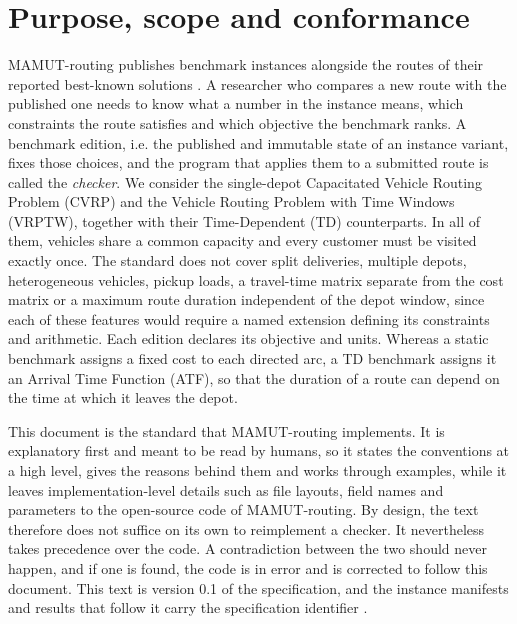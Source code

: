 \section{Purpose, scope and conformance}\label{sec:scope}

MAMUT-routing publishes benchmark instances alongside the routes of their reported best-known solutions \autocite{pichonMAMUTRouting2026}. A researcher who compares a new route with the published one needs to know what a number in the instance means, which constraints the route satisfies and which objective the benchmark ranks. A benchmark edition, i.e. the published and immutable state of an instance variant, fixes those choices, and the program that applies them to a submitted route is called the \emph{checker}. We consider the single-depot Capacitated Vehicle Routing Problem (CVRP) and the Vehicle Routing Problem with Time Windows (VRPTW), together with their Time-Dependent (TD) counterparts. In all of them, vehicles share a common capacity and every customer must be visited exactly once. The standard does not cover split deliveries, multiple depots, heterogeneous vehicles, pickup loads, a travel-time matrix separate from the cost matrix or a maximum route duration independent of the depot window, since each of these features would require a named extension defining its constraints and arithmetic. Each edition declares its objective and units. Whereas a static benchmark assigns a fixed cost to each directed arc, a TD benchmark assigns it an Arrival Time Function (ATF), so that the duration of a route can depend on the time at which it leaves the depot.

This document is the standard that MAMUT-routing implements. It is explanatory first and meant to be read by humans, so it states the conventions at a high level, gives the reasons behind them and works through examples, while it leaves implementation-level details such as file layouts, field names and parameters to the open-source code of MAMUT-routing. By design, the text therefore does not suffice on its own to reimplement a checker. It nevertheless takes precedence over the code. A contradiction between the two should never happen, and if one is found, the code is in error and is corrected to follow this document. This text is version 0.1 of the specification, and the instance manifests and results that follow it carry the specification identifier .

